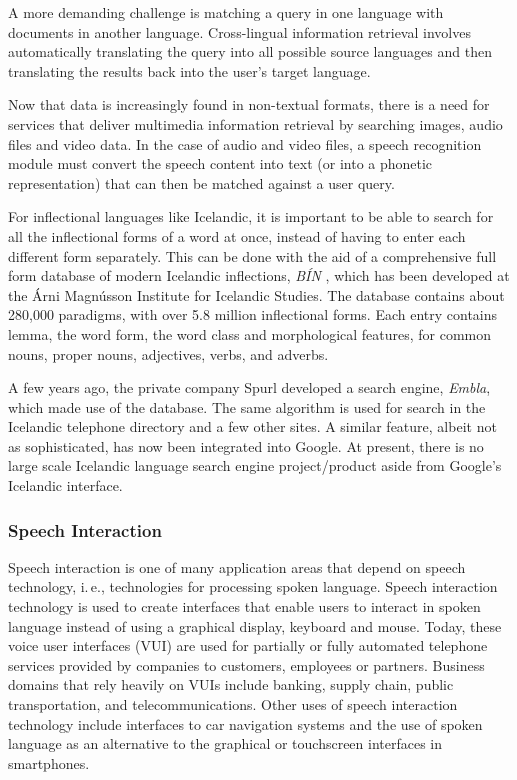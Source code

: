 \begin{multicols}{2}
A more demanding challenge is matching a query in one language with documents in another language. Cross-lingual information retrieval involves automatically translating the query into all possible source languages and then translating the results back into the user's target language.

Now that data is increasingly found in non-textual formats, there is a need for services that deliver multimedia information retrieval by searching images, audio files and video data. In the case of audio and video files, a speech recognition module must convert the speech content into text (or into a phonetic representation) that can then be matched against a user query.

For inflectional languages like Icelandic, it is important to be able to search for all the inflectional forms of a word at once, instead of having to enter each different form separately. This can be done with the aid of a comprehensive full form database of modern Icelandic inflections, \textit{BÍN} \cite{bin1}, which has been developed at the Árni Magnússon Institute for Icelandic Studies. The database contains about 280,000 paradigms, with over 5.8 million inflectional forms. Each entry contains lemma, the word form, the word class and morphological features, for common nouns, proper nouns, adjectives, verbs, and adverbs.

A few years ago, the private company Spurl developed a search engine, \textit{Embla}, which made use of the database. The same algorithm is used for search in the Icelandic telephone directory and a few other sites. A similar feature, albeit not as sophisticated, has now been integrated into Google. At present, there is no large scale Icelandic language search engine project/product aside from Google’s Icelandic interface.

\subsubsection{Speech Interaction}

Speech interaction is one of many application areas that depend on speech technology, i.\,e., technologies for processing spoken language. Speech interaction technology is used to create interfaces that enable users to interact in spoken language instead of using a graphical display, keyboard and mouse.  Today, these voice user interfaces (VUI) are used for partially or fully automated telephone services provided by companies to customers, employees or partners. Business domains that rely heavily on VUIs include banking, supply chain, public transportation, and telecommunications. Other uses of speech interaction technology include interfaces to car navigation systems and the use of spoken language as an alternative to the graphical or touchscreen interfaces in smartphones.


\end{multicols}
